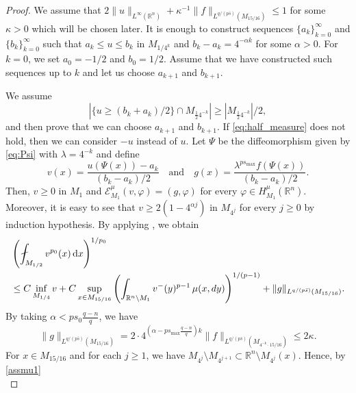 \documentclass[11pt]{amsart}
\theoremstyle{plain}
\theoremstyle{definition}
\numberwithin{equation}{section}
\renewcommand{\d}{\textnormal{d}}
\newcommand{\R}{\mathbb{R}}
\begin{document}
\begin{proof}
We assume that $2\|u\|_{L^\infty(\R^n)} + \kappa^{-1} \|f\|_{L^{q/(p\bar{s})}(M_{15/16})} \leq 1$ for some $\kappa > 0$ which will be chosen later. It is enough to construct sequences $\lbrace a_k \rbrace_{k=0}^\infty$ and $\lbrace b_k \rbrace_{k=0}^\infty$ such that $a_k \leq u \leq b_k$ in $M_{1/4^k}$ and $b_k - a_k = 4^{-\alpha k}$ for some $\alpha > 0$. For $k=0$, we set $a_0 = -1/2$ and $b_0 = 1/2$. Assume that we have constructed such sequences up to $k$ and let us choose $a_{k+1}$ and $b_{k+1}$.

We assume
\begin{equation} \label{eq:half_measure}
|\lbrace u \geq (b_k+a_k)/2 \rbrace \cap M_{\frac{1}{2}4^{-k}}| \geq |M_{\frac{1}{2}4^{-k}}|/2,
\end{equation}
and then prove that we can choose $a_{k+1}$ and $b_{k+1}$. If \eqref{eq:half_measure} does not hold, then we can consider $-u$ instead of $u$. Let $\Psi$ be the diffeomorphism given by \eqref{eq:Psi} with $\lambda = 4^{-k}$ and define
\begin{equation*}
v(x) = \frac{u(\Psi(x))-a_k}{(b_k-a_k)/2} \quad\text{and}\quad g(x) = \frac{\lambda^{ps_{\max}} f(\Psi(x))}{(b_k-a_k)/2}.
\end{equation*}
Then, $v \geq 0$ in $M_1$ and $\mathcal{E}^\mu_{M_1}(v,\varphi) = (g, \varphi)$ for every $\varphi \in H^\mu_{M_1}(\R^n)$. Moreover, it is easy to see that $v \geq 2(1-4^{\alpha j}) $ in $M_{4^j}$ for every $j \geq 0$ by induction hypothesis. By applying , we obtain
\begin{equation} \label{eq:v_WHI}
\begin{split}
&\left( \fint_{M_{1/2}} v^{p_0}(x) \,\mathrm{d}x \right)^{1/p_0} \\
&\leq C\inf_{M_{1/4}} v + C \sup_{x \in M_{15/16}} \left( \int_{\R^n\setminus M_1} v^-(y)^{p-1} \,\mu(x, \d y) \right)^{1/(p-1)} + \|g\|_{L^{q/(p\bar{s})}(M_{15/16})}.
\end{split}
\end{equation}
By taking $\alpha < ps_0 \frac{q-n}{q}$, we have
\begin{equation} \label{eq:g}
\|g\|_{L^{q/(p\bar{s})}(M_{15/16})} = 2\cdot 4^{(\alpha-ps_{\max}\frac{q-n}{q})k} \|f\|_{L^{q/(p\bar{s})}(M_{4^{-k} \cdot 15/16})} \leq 2\kappa.
\end{equation}
For $x \in M_{15/16}$ and for each $j \geq 1$, we have $M_{4^j} \setminus M_{4^{j+1}} \subset \R^n \setminus M_{4^j}(x)$. Hence, by \eqref{assmu1}
\begin{equation} \label{eq:tail}

\end{equation}
\end{proof}
\end{document}
